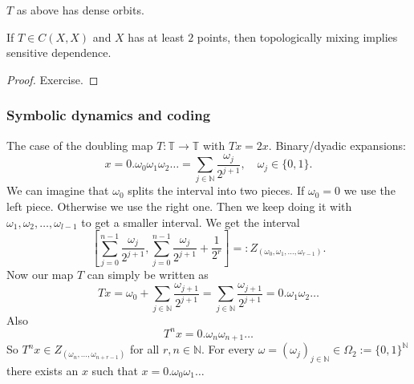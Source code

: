 \documentclass{article}
\newcommand*{\N}{\mathbb{N}}
\newcommand*{\T}{\mathbb{T}}
\newcommand*{\reci}[1]{{\frac{1}{#1}}}
\begin{document}
\begin{prop}
    $T$ as above has dense orbits.
\end{prop}

\begin{prop}
    If $T\in C(X,X)$ and $X$ has at least $2$ points, then topologically mixing implies sensitive dependence.
\end{prop}

\begin{proof}
    Exercise.
\end{proof}

\subsubsection{Symbolic dynamics and coding}

The case of the doubling map $T:\T\to\T$ with $Tx = 2x$.
\newline
\newline
Binary/dyadic expansions:
$$x = 0.\omega_0\omega_1\omega_2\dots = \sum_{j\in\N}\frac{\omega_j}{2^{j+1}},\quad \omega_j\in\{0,1\}.$$
We can imagine that $\omega_0$ splits the interval into two pieces. If $\omega_0=0$ we use the left piece. Otherwise we use the right one. Then we keep doing it with $\omega_1,\omega_2,\dots,\omega_{l-1}$ to get a smaller interval. We get the interval
$$\left[\sum_{j=0}^{n-1}\frac{\omega_j}{2^{j+1}},\sum_{j=0}^{n-1}\frac{\omega_j}{2^{j+1}}+\reci{2^r}\right] =: Z_{(\omega_0,\omega_1,\dots,\omega_{r-1})}.$$
Now our map $T$ can simply be written as
$$Tx=\omega_0+\sum_{j\in\N}\frac{\omega_{j+1}}{2^{j+1}} = \sum_{j\in\N}\frac{\omega_{j+1}}{2^{j+1}} = 0.\omega_1\omega_2\dots$$
Also
$$T^nx=0.\omega_n\omega_{n+1}\dots$$
So $T^nx\in Z_{(\omega_n,\dots,\omega_{n+r-1})}$ for all $r,n \in \N$. For every $\omega = (\omega_j)_{j\in\N}\in\Omega_2:=\{0,1\}^{\N}$ there exists an $x$ such that $x=0.\omega_0\omega_1\dots$
\end{document}
